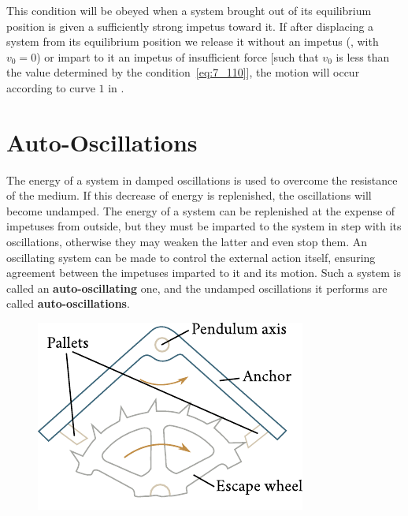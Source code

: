 \noindent
This condition will be obeyed when a system brought out of its equilibrium position is given a sufficiently strong impetus toward it. If after displacing a system from its equilibrium position we release it without an impetus (\ie, with $v_0=0$) or impart to it an impetus of insufficient force [such that $v_0$ is less than the value determined by the condition~\eqref{eq:7_110}], the motion will occur according to curve $1$ in .

\section{Auto-Oscillations}\label{sec:7_11}

The energy of a system in damped oscillations is used to overcome the resistance of the medium. If this decrease of energy is replenished, the oscillations will become undamped. The energy of a system can be replenished at the expense of impetuses from outside, but they must be imparted to the system in step with its oscillations, otherwise they may weaken the latter and even stop them. An oscillating system can be made to control the external action itself, ensuring agreement between the impetuses imparted to it and its motion. Such a system is called an \textbf{auto-oscillating} one, and the undamped oscillations it performs are called \textbf{auto-oscillations}.

\begin{figure}[t]
	\begin{center}
		\includegraphics[scale=0.95]{figures/ch_07/fig_7_21.pdf}
		\caption[]{}
		\label{fig:7_21}
	\end{center}
	\vspace{-0.8cm}
\end{figure}

